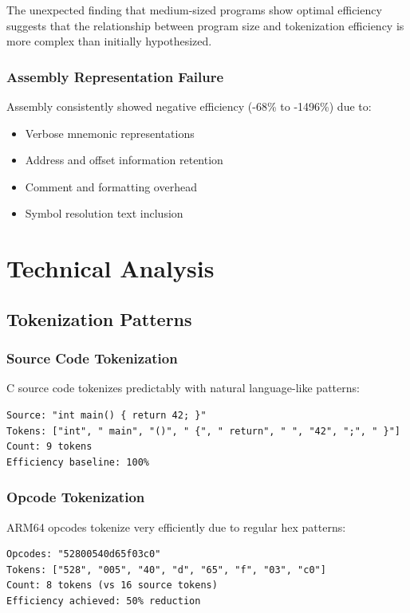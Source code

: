 \documentclass[11pt,a4paper]{article}
\begin{document}
The unexpected finding that medium-sized programs show optimal efficiency suggests that the relationship between program size and tokenization efficiency is more complex than initially hypothesized.

\subsubsection{Assembly Representation Failure}
Assembly consistently showed negative efficiency (-68\% to -1496\%) due to:
\begin{itemize}
    \item Verbose mnemonic representations
    \item Address and offset information retention
    \item Comment and formatting overhead
    \item Symbol resolution text inclusion
\end{itemize}

\section{Technical Analysis}

\subsection{Tokenization Patterns}

\subsubsection{Source Code Tokenization}
C source code tokenizes predictably with natural language-like patterns:
\begin{lstlisting}[caption=Source code tokenization example]
Source: "int main() { return 42; }"
Tokens: ["int", " main", "()", " {", " return", " ", "42", ";", " }"]
Count: 9 tokens
Efficiency baseline: 100%
\end{lstlisting}

\subsubsection{Opcode Tokenization}
ARM64 opcodes tokenize very efficiently due to regular hex patterns:
\begin{lstlisting}[caption=Opcode tokenization example]
Opcodes: "52800540d65f03c0"
Tokens: ["528", "005", "40", "d", "65", "f", "03", "c0"]
Count: 8 tokens (vs 16 source tokens)
Efficiency achieved: 50% reduction
\end{lstlisting}
\end{document}
